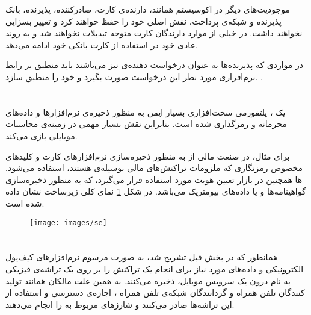 \documentclass[oneside]{report}
\begin{document}
موجودیت‌‌های دیگر در اکوسیستم 
			{\normalsize {}}
همانند،   دارنده‌ی کارت،   صادرکننده، پذیرنده،   بانک پذیرنده و شبکه‌ی پرداخت، نقش اصلی خود را حفظ خواهند کرد و تغییر بسزایی نخواهند داشت. در خیلی از موارد دارندگان کارت متوجه تبدیلات  
{\normalsize {}}
نخواهند شد و به روند عادی خود در استفاده از کارت بانکی خود ادامه می‌دهد.

در مواردی که پذیرنده‌ها به عنوان درخواست دهنده‌ی 
{\normalsize {}}
نیز می‌باشند باید منطبق بر رابط نرم‌افزاری
{\normalsize {}}
مورد نظر این درخواست صورت بگیرد و خود را منطبق سازد.
\cite{emvframework}.

\section{{\large {}}}
یک 
{\normalsize {}}
، پلتفورمی سخت‌افزاری بسیار ایمن به منظور ذخیره‌ی نرم‌افزارها و داده‌های محرمانه و رمزگذاری شده است. بنابراین 
{\normalsize {}}
نقش بسیار مهمی در زمینه‌ی محاسبات موبایلی 
بازی می‌کند.

برای مثال، در صنعت مالی از 
{\normalsize {}}
 به منظور ذخیره‌سازی نرم‌افزار‌های کارت و کلیدهای مخصوص رمزنگاری که ملزومات تراکنش‌های مالی
{\normalsize {}}
بوسیله‌ی 
{\normalsize {}}
هستند، 
استفاده می‌شود. 
{\normalsize {}} ها 
همچنین در بازار تعیین هویت مورد استفاده قرار می‌گیرد، که به منظور ذخیره‌سازی گواهینامه‌ها 
	 	و یا داده‌های بیومتریک 
	 	می‌باشد. در شکل 
	\ref{fig:se}
	نمای کلی زیرساخت 
	{\normalsize  {}}
	نشان داده شده است.

\begin{figure}[h]
	\centering
	\texttt{[image: images/se]}
	\caption{{\footnotesize {}}}
	\label{fig:se}
\end{figure}



\section{{\large {}}}
همانطور که در بخش قبل تشریح شد،
به صورت مرسوم  نرم‌افزارهای کیف‌پول الکترونیکی و
{\normalsize {}}
داده‌های مورد نیاز برای انجام یک تراکنش را بر روی یک تراشه‌ی فیزیکی به نام 
{\normalsize {}}
درون یک سرویس موبایل،
ذخیره می‌کنند. به همین علت مالکان 
{\normalsize {}}
همانند تولید کنندگان تلفن همراه و گردانندگان شبکه‌ی تلفن همراه
{\normalsize {}}
	 	، اجازه‌ی دسترسی و استفاده از این تراشه‌ها  صادر می‌کنند و شارژهای مربوط به 
{\normalsize {}}
را انجام می‌دهند.
\end{document}
